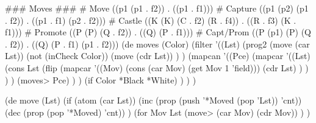\begin{wideverbatim}

 
### Moves ###
# Move      ((p1 (p1 . f2))        . ((p1 . f1)))
# Capture   ((p1 (p2) (p1 . f2))   . ((p1 . f1) (p2 . f2)))
# Castle    ((K (K) (C . f2) (R . f4)) . ((R . f3) (K . f1)))
# Promote   ((P (P) (Q . f2))      . ((Q) (P . f1)))
# Capt/Prom ((P (p1) (P) (Q . f2)) . ((Q) (P . f1) (p1 . f2)))
(de moves (Color)
   (filter
      '((Lst)
         (prog2
            (move (car Lst))
            (not (inCheck Color))
            (move (cdr Lst)) ) )
      (mapcan
         '((Pce)
            (mapcar
               '((Lst)
                  (cons Lst
                     (flip
                        (mapcar
                           '((Mov) (cons (car Mov) (get Mov 1 'field)))
                           (cdr Lst) ) ) ) )
               (moves> Pce) ) )
         (if Color *Black *White) ) ) )
 
(de move (Lst)
   (if (atom (car Lst))
      (inc (prop (push '*Moved (pop 'Lst)) 'cnt))
      (dec (prop (pop '*Moved) 'cnt)) )
   (for Mov Lst
      (move> (car Mov) (cdr Mov)) ) )
 

\end{wideverbatim}


